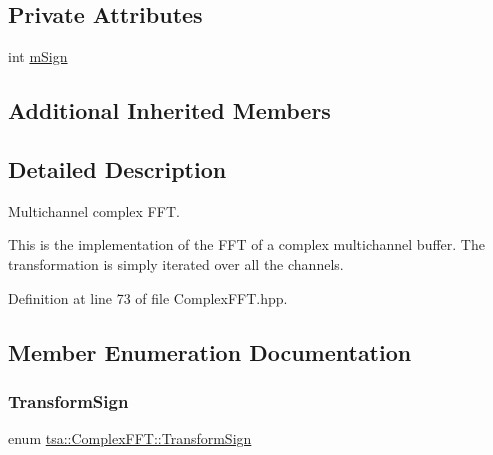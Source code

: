 \subsection*{Private Attributes}
\begin{DoxyCompactItemize}
\item 
int \hyperlink{classtsa_1_1_complex_f_f_t_a97a15c1129372c7abb6ba3ba864ca065}{m\+Sign}
\end{DoxyCompactItemize}
\subsection*{Additional Inherited Members}


\subsection{Detailed Description}
Multichannel complex F\+FT. 

This is the implementation of the F\+FT of a complex multichannel buffer. The transformation is simply iterated over all the channels. 

Definition at line 73 of file Complex\+F\+F\+T.\+hpp.



\subsection{Member Enumeration Documentation}
\mbox{\label{classtsa_1_1_complex_f_f_t_a4e90a372fa0610f957f2c683335aa766}} 
\subsubsection{\texorpdfstring{Transform\+Sign}{TransformSign}}
{\footnotesize\ttfamily enum \hyperlink{classtsa_1_1_complex_f_f_t_a4e90a372fa0610f957f2c683335aa766}{tsa\+::\+Complex\+F\+F\+T\+::\+Transform\+Sign}}

